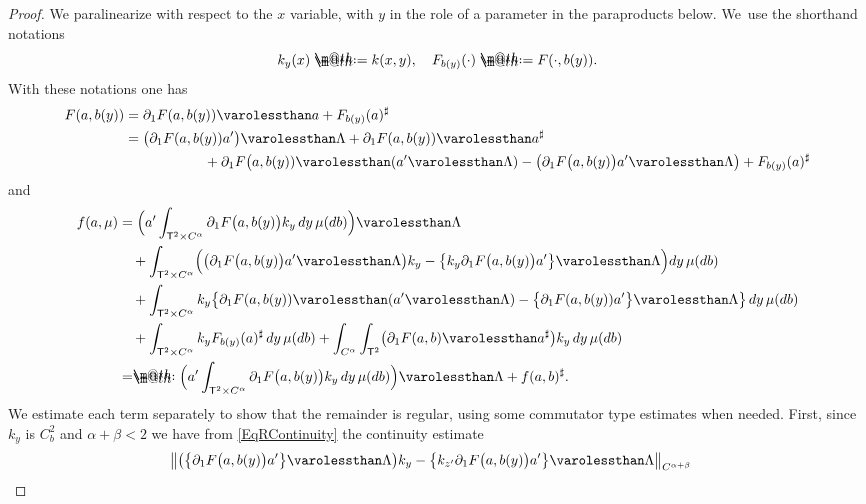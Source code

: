 \documentclass[10pt]{amsart}
\makeatletter
\theoremstyle{definition}
\newcommand*{\defeq}{\mathrel{\rlap{%
\raisebox{0.3ex}{$\m@th\cdot$}}%
\raisebox{-0.3ex}{$\m@th\cdot$}}%
=}
\newcommand*{\eqdef}{=\mathrel{\rlap{%
\raisebox{0.3ex}{$\m@th\cdot$}}%
\raisebox{-0.3ex}{$\m@th\cdot$}}%
}
\makeatother
\begin{document}
\begin{proof}
We paralinearize with respect to the $x$ variable, with $y$ in the role of a parameter in the paraproducts below. We~use the shorthand notations
\[
k_y(x) \defeq k(x, y), \quad F_{b(y)}(\cdot) \defeq F(\cdot,b(y)).
\]
With these notations one has
\begin{equation*} \begin{split}
F(a, b(y)) &= \partial_1F(a, b(y)) \varolessthan a + F_{b(y)}(a)^\sharp \\
&= \bigl(\partial_1F(a, b(y)) a'\bigr) \varolessthan \Lambda + \partial_1F(a, b(y)) \varolessthan a^\sharp \\
&\hspace*{2cm}+ \partial_1F\bigl(a, b(y)) \varolessthan (a' \varolessthan \Lambda) - \bigl( \partial_1F\bigl(a, b(y)\bigr) a' \varolessthan \Lambda \bigr) + F_{b(y)}(a)^\sharp
\end{split} \end{equation*}
and
\begin{align*}
f(a, \mu) &= \Bigl( a' \int_{\mathsf{T}^2 \times C^\alpha} \partial_1F\bigl(a, b(y)\bigr) k_y \, dy \,\mu(db) \Bigr) \varolessthan \Lambda
\\
&\quad+ \int_{\mathsf{T}^2 \times C^\alpha} \Bigl(\bigl( \partial_1 F\bigl(a, b(y)\bigr) a' \varolessthan \Lambda\bigr) k_y - \bigl\{ k_y\partial_1 F\bigl(a, b(y)\bigr) a'\bigr\} \varolessthan \Lambda \Bigr) dy\,\mu(db) \\
&\quad+ \int_{\mathsf{T}^2 \times C^\alpha} k_y \bigl\{ \partial_1F(a, b(y)) \varolessthan (a' \varolessthan \Lambda) - \bigl\{\partial_1F(a, b(y)) a'\bigr\} \varolessthan \Lambda \bigr\} \, dy \,\mu(db)
\\
&\quad+ \int_{\mathsf{T}^2 \times C^\alpha} k_y F_{b(y)}(a)^\sharp \, dy \, \mu(db) + \int_{C^\alpha}\int_{\mathsf{T}^2} \bigl(\partial_1 F(a, b) \varolessthan a^\sharp \bigr) k_y \, dy \,\mu(db)
\\
&\eqdef \Bigl( a' \int_{\mathsf{T}^2 \times C^\alpha} \partial_1F\bigl(a, b(y)\bigr) k_y \, dy \, \mu(db)\Bigr) \varolessthan \Lambda + f(a,b)^\sharp.
\end{align*}
We estimate each term separately to show that the remainder is regular, using some commutator type estimates when needed. First, since $k_y$ is $C^2_b$ and $\alpha+\beta<2$ we have from \eqref{EqRContinuity} the continuity estimate
\begin{equation*} \begin{split}
\big\Vert \bigl( \bigl\{\partial_1 F\bigl(a, b(y)\bigr) a' \bigr\} \varolessthan \Lambda \bigr) k_y - \bigl\{ k_{z'}\partial_1 &F\bigl(a, b(y)\bigr) a'\bigr\} \varolessthan \Lambda \big\Vert_{C^{\alpha+\beta}}

\end{split}
\end{equation*}
\end{proof}
\end{document}
